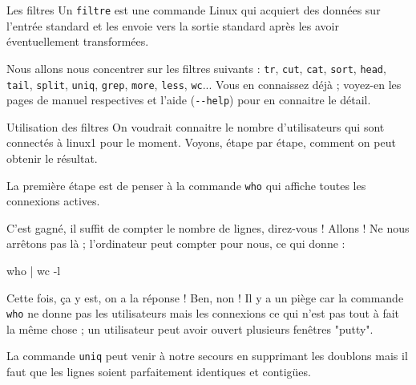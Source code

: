 \documentclass[a4paper,11pt]{article}
\begin{document}
		\medskip
		\begin{coltbox}{Les filtres}
				Un \verb_filtre_ est une commande Linux qui acquiert des donn\'ees sur l'entr\'ee standard 
				et les envoie vers la sortie standard apr\`es les avoir \'eventuellement transform\'ees.
		\end{coltbox}

		Nous allons nous concentrer sur les filtres suivants : \verb_tr_,
		\verb_cut_, \verb_cat_, \verb_sort_, \verb_head_, \verb_tail_,
		\verb_split_, \verb_uniq_, \verb_grep_, \verb_more_, \verb_less_,
		\verb_wc_...  Vous en connaissez d\'ej\`a ; voyez-en les pages de
		manuel respectives et l'aide (\verb_--help_) pour en connaitre le
		d\'etail.
				
           
			
		\begin{Tutoriel}{Utilisation des filtres}
					On voudrait connaitre le nombre d'utilisateurs qui sont connect\'es \`a linux1 pour le moment.
					Voyons, \'etape par \'etape, comment on peut obtenir le r\'esultat.
				
           		\begin{steps}
				
				\item La premi\`ere \'etape est de penser \`a la commande \verb_who_
					qui affiche toutes les connexions actives.
					
				\item C'est gagn\'e, il suffit de compter le nombre de lignes, direz-vous !
						Allons ! Ne nous arr\^etons pas l\`a ; l'ordinateur peut compter pour nous,
						ce qui donne :
						\begin{Console}
							who | wc -l
						\end{Console}
						
				\item Cette fois, \c ca y est, on a la r\'eponse ! Ben, non !
					Il y a un pi\`ege car la commande \verb_who_ ne donne pas les utilisateurs
					mais les connexions ce qui n'est pas tout \`a fait la m\^eme chose ;
					un utilisateur peut avoir ouvert plusieurs fen\^etres "putty". 
						
            \par
        
					La commande \verb_uniq_ peut venir \`a notre secours en supprimant
					les doublons mais il faut que les lignes soient parfaitement identiques
					et contig\"ues.
						
            \par
        

\end{steps}
\end{Tutoriel}
\end{document}
